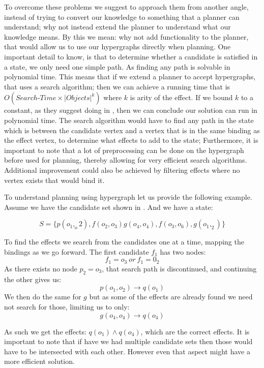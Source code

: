 \documentclass[\master/Master.tex]{subfiles}
\begin{document}
To overcome these problems we suggest to approach them from another angle, 
instead of trying to convert our knowledge to something that a planner can understand; 
why not instead extend the planner to understand what our knowledge means.
By this we mean: why not add functionality to the planner, that would allow us to use our hypergraphs directly when planning.
One important detail to know, is that to determine whether a candidate is satisfied in a state, we only need one simple path. 
As finding any path is solvable in polynomial time. 
This means that if we extend a planner to accept hypergraphs, that uses a search algorithm;
then we can achieve a running time that is $O(Search\texttt{-}Time \times \left| Objects \right|^k)$ where $k$ is arity of the effect. 
If we bound $k$ to a constant, as they suggest doing in \cite{Walsh2008}, then we can conclude our solution can run in polynomial time. 
The search algorithm would have to find any path in the state which is between the candidate vertex and a vertex that is in the same binding as the effect vertex, to determine what effects to add to the state; 
Furthermore, it is important to note that a lot of preprocessing can be done on the hypergraph before used for planning, thereby allowing for very efficient search algorithms. 
Additional improvement could also be achieved by filtering effects where no vertex exists that would bind it.

\begin{example} To understand planning using hypergraph let us provide the following example.
	Assume we have the candidate set shown in . And we have a state:
	
	\begin{equation*}
		S = \{ p(o_1,_o2), f(o_2,o_3) g(o_4,o_4), f(o_3,o_6), g(o_1,_2) \}
	\end{equation*}
	
	To find the effects we search from the candidates one at a time, mapping the bindings as we go forward.
	The first candidate $f_1$ has two nodes:
	\begin{equation*}
		f_1 = o_3 ~ or ~ f_1 = 0_2
	\end{equation*}
	 As there exists no node $p_2 = o_3$, that search path is discontinued, and continuing the other gives us:
	 \begin{equation*}
		 p(o_1,o_2) \rightarrow q(o_1)
	 \end{equation*}
	 We then do the same for $g$ but as some of the effects are already found we need not search for those, limiting us to only:
	 \begin{equation*}
		 g(o_4,o_4) \rightarrow q(o_4)
	 \end{equation*}
	 
	 As such we get the effects: $q(o_1)\land q(o_4)$, which are the correct effects.
	 It is important to note that if have we had multiple candidate sets then those would have to be intersected with each other. 
	 However even that aspect might have a more efficient solution.
	
\end{example}
\end{document}
